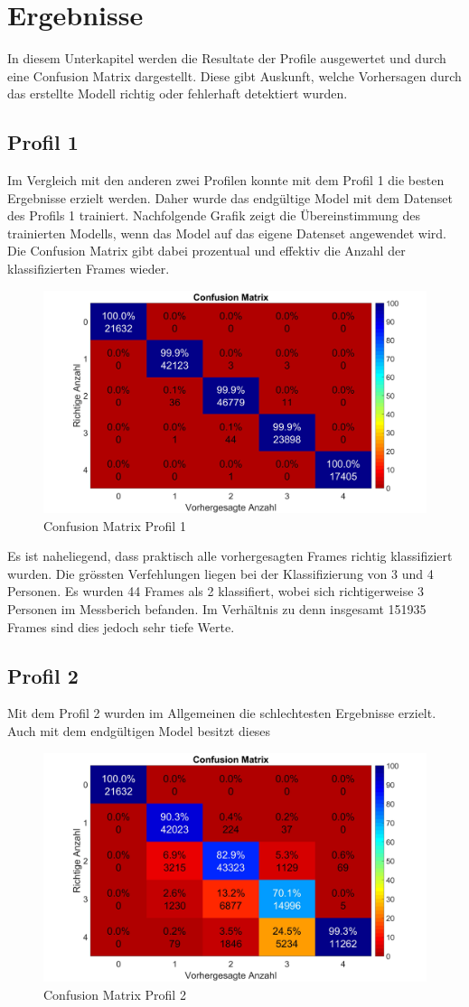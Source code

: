 \section{Ergebnisse}

In diesem Unterkapitel werden die Resultate der Profile ausgewertet und durch eine Confusion Matrix dargestellt. Diese gibt Auskunft, welche Vorhersagen  durch das erstellte Modell richtig oder fehlerhaft detektiert wurden. 


\subsection{Profil 1}
Im Vergleich mit den anderen zwei Profilen konnte mit dem Profil 1 die besten Ergebnisse erzielt werden. Daher wurde das endgültige Model mit dem Datenset des Profils 1 trainiert. Nachfolgende Grafik zeigt die Übereinstimmung des trainierten Modells, wenn das Model auf das eigene Datenset angewendet wird. Die Confusion Matrix gibt dabei prozentual und effektiv die Anzahl der klassifizierten Frames wieder.


\begin{figure}[H]
	\centering
	\includegraphics[width=0.49\linewidth]{fig/Profil_1}
	\caption[Confusion Matrix Profil 1]{Confusion Matrix Profil 1}
	\label{fig:profil1}
\end{figure}

 Es ist naheliegend, dass praktisch alle vorhergesagten Frames richtig klassifiziert wurden. Die grössten Verfehlungen liegen bei der Klassifizierung von 3 und 4 Personen. Es wurden 44 Frames als 2 klassifiert, wobei sich richtigerweise 3 Personen im Messberich befanden. Im Verhältnis zu denn insgesamt 151935 Frames sind dies jedoch sehr tiefe Werte.

\subsection{Profil 2}
Mit dem Profil 2 wurden im Allgemeinen die schlechtesten Ergebnisse erzielt. Auch mit dem endgültigen Model besitzt dieses  

\begin{figure}[H]
	\centering
	\includegraphics[width=0.5\linewidth]{fig/Profil_2}
	\caption[Confusion Matrix Profil 2]{Confusion Matrix Profil 2}
	\label{fig:profil2}
\end{figure}

